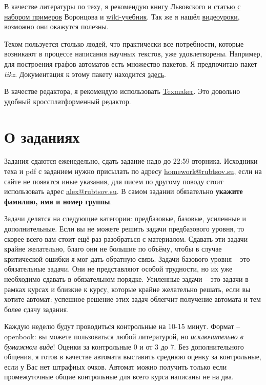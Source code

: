 \documentclass[12pt]{article}
\theoremstyle{definiton}
\theoremstyle{definition}
\begin{document}
	В качестве литературы по теху, я рекомендую \href{ftp://ftp.mccme.ru/pub/tex/lvovsky-newbook/pdf.zip}{книгу} Львовского  и \href{http://www.ccas.ru/voron/download/voron05latex.pdf}{статью с набором примеров} Воронцова и \href{http://en.wikibooks.org/wiki/LaTeX/}{wiki-учебник}. Так же я нашёл \href{http://www.youtube.com/ShareLaTeX}{видеоуроки}, возможно они окажутся полезны.

	Техом пользуется столько людей, что практически все потребности, которые возникают в процессе написания научных текстов, уже удовлетворены. Например, для построения графов автоматов есть множество пакетов. Я предпочитаю пакет \emph{tikz}. Документация к этому пакету находится \href{http://ctan.usu.ru/graphics/pgf/base/doc/generic/pgf/pgfmanual.pdf}{здесь}.

	В качестве редактора, я рекомендую использовать \href{http://www.xm1math.net/texmaker/}{Texmaker}. Это довольно удобный кроссплатформенный редактор.

	\section{О заданиях}

	Задания сдаются еженедельно, сдать задание надо до 22:59 вторника. Исходники теха и pdf с заданием нужно присылать по адресу \href{mailto:homework@rubtsov.su}{homework@rubtsov.su}, если на сайте не появятся иные указания, для писем по другому поводу стоит использовать адрес \href{mailto:alex@rubtsov.su}{alex@rubtsov.su}. В самом задании обязательно \textbf{укажите фамилию, имя и номер группы}.

	Задачи делятся на следующие категории: предбазовые, базовые, усиленные и дополнительные. Если вы не можете решить задачи предбазового уровня, то скорее всего вам стоит ещё раз разобраться с материалом. Сдавать эти задачи крайне желательно, благо они не большие по объёму, чтобы в случае критической ошибки я мог дать обратную связь. Задачи базового уровня -- это обязательные задачи. Они не представляют особой трудности, но их уже необходимо сдавать в обязательном порядке. Усиленные задачи -- это задачи в рамках курсах и близкие к курсу, которые крайне желательно решать, если вы хотите автомат: успешное решение этих задач облегчит получение автомата и тем более сдачу задания.


	Каждую неделю будут проводиться контрольные на 10-15 минут. Формат -- openbook: вы можете пользоваться любой литературой, но \emph{исключительно в бумажном виде}! Оценки за контрольные $0$ и от $3$ до $7$. Без дополнительного общения, я готов в качестве автомата выставить среднюю оценку за контрольные, если у Вас нет штрафных очков. Автомат можно получить только если промежуточные общие контрольные для всего курса написаны не на два.
\end{document}
